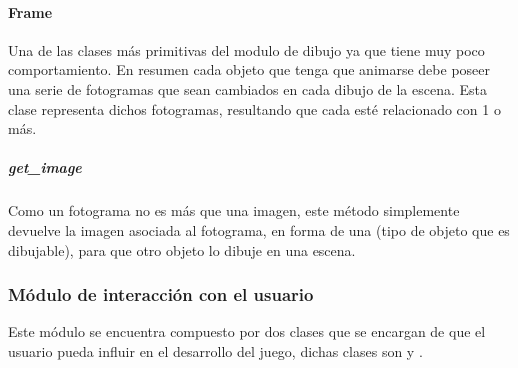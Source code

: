         \paragraph{Frame}
            Una de las clases más primitivas del modulo de dibujo ya que tiene
            muy poco comportamiento. En resumen cada objeto que tenga que
            animarse debe poseer una serie de fotogramas que sean cambiados en
            cada dibujo de la escena. Esta clase representa dichos fotogramas,
            resultando que cada  esté relacionado con 1 o más.
            \subparagraph{get\_image}
                Como un fotograma no es más que una imagen, este método simplemente
                devuelve la imagen asociada al fotograma, en forma de una
                 (tipo de objeto que es dibujable), para que otro
                objeto lo dibuje en una escena.
    \subsubsection{Módulo de interacción con el usuario}
        Este módulo se encuentra compuesto por dos clases que se encargan de que
        el usuario pueda influir en el desarrollo del juego, dichas clases son
         y .
        \def\path{client/handlers.jpg}
        \def\scale{.6}
        \def\text{handlers}
        
